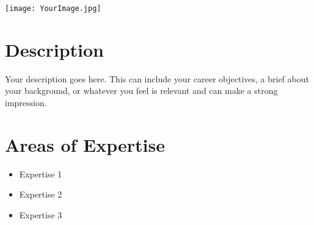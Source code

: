 \documentclass[a4paper,10pt]{article}
\begin{document}
\begin{minipage}[t]{0.2\textwidth} 
\texttt{[image: YourImage.jpg]}
\end{minipage}
\begin{minipage}[t]{0.35\textwidth} 
\section*{Description}
Your description goes here. This can include your career objectives, a brief about your background, or whatever you feel is relevant and can make a strong impression.
\end{minipage}
\begin{minipage}[t]{0.45\textwidth} 
\section*{Areas of Expertise}
\begin{itemize}
\item Expertise 1
\item Expertise 2
\item Expertise 3
\end{itemize}
\end{minipage}

\end{document}
